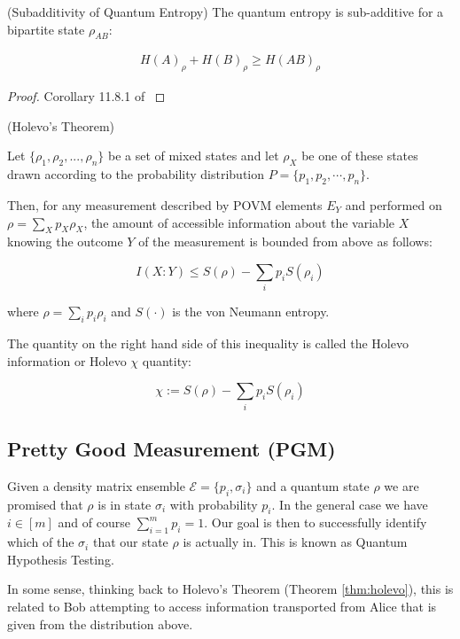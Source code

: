 \documentclass[main.tex]{subfiles}
\begin{document}
\begin{proposition}
\label{prop:subadd-entropy}
(Subadditivity of Quantum Entropy)
The quantum entropy is sub-additive for a bipartite state $\rho_{AB}$:

\begin{align*}
H(A)_\rho + H(B)_\rho \geq H(AB)_\rho
\end{align*}
\begin{proof}
Corollary 11.8.1 of \cite{wilde2013quantum}
\end{proof}
\end{proposition}

\begin{theorem}\label{thm:holevo}
(Holevo's Theorem)

Let $\{\rho_1, \rho_2, ..., \rho_n\}$ be a set of mixed states and let $\rho_X$ be one of these states drawn according to the probability distribution $P = \{p_1, p_2, \cdots , p_n\}$.

Then, for any measurement described by POVM elements ${E_Y}$ and performed on $ \rho =\sum _{X}p_{X}\rho _{X}$, the amount of accessible information about the variable $X$ knowing the outcome $Y$ of the measurement is bounded from above as follows:

$${ I(X:Y)\leq S(\rho )-\sum _{i}p_{i}S(\rho _{i})}$$

where $\rho =\sum _{i}p_{i}\rho _{i}$ and $ S(\cdot )$ is the von Neumann entropy.

The quantity on the right hand side of this inequality is called the Holevo information or Holevo $\chi$ quantity:

$$ \chi :=S(\rho )-\sum _{i}p_{i}S(\rho _{i})$$
\end{theorem}

\subsection{Pretty Good Measurement (PGM)}
\label{app:pgm}

Given a density matrix ensemble $\mathcal{E} = \{p_i, \sigma_i\}$ and a quantum state $\rho$ we are promised that $\rho$ is in state $\sigma_i$ with probability $p_i$. In the general case we have $i \in [m]$ and of course $\sum_{i=1}^m p_i = 1$. Our goal is then to successfully identify which of the $\sigma_i$ that our state $\rho$ is actually in. This is known as Quantum Hypothesis Testing.

In some sense, thinking back to Holevo's Theorem (Theorem \ref{thm:holevo}), this is related to Bob attempting to access information transported from Alice that is given from the distribution above.
\end{document}
